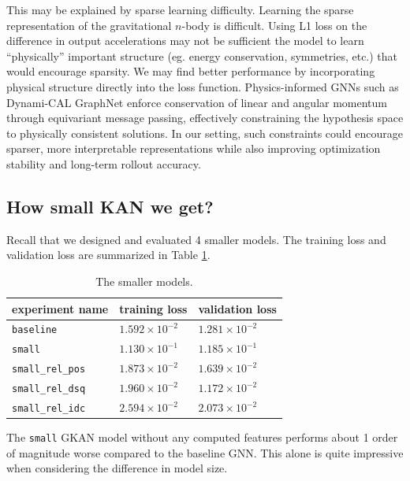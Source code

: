 \documentclass{article}
\begin{document}
This may be explained by sparse learning difficulty. Learning the sparse representation of the gravitational $n$-body is difficult. Using L1 loss on the difference in output accelerations may not be sufficient the model to learn ``physically'' important structure (eg. energy conservation, symmetries, etc.) that would encourage sparsity.  We may find better performance by incorporating physical structure directly into the loss function. Physics-informed GNNs such as Dynami-CAL GraphNet \parencite{sharma2025dynamicalgraphnetphysicsinformedgraph} enforce conservation of linear and angular momentum through equivariant message passing, effectively constraining the hypothesis space to physically consistent solutions. In our setting, such constraints could encourage sparser, more interpretable representations while also improving optimization stability and long-term rollout accuracy.

\subsection{How small KAN we get?}

Recall that we designed and evaluated 4 smaller models. The training loss and validation loss are summarized in Table \ref{tab:results-small}.

\begin{table}[h]

\centering
\caption{The smaller models.}
\begin{tabular}{l|l|l}
\hline
experiment name & training loss & validation loss \\
\hline
\texttt{baseline} & $1.592 \times 10^{-2}$ & $1.281 \times 10^{-2}$ \\
\texttt{small} & $1.130 \times 10^{-1}$ & $1.185 \times 10^{-1}$ \\
\texttt{small\_rel\_pos} & $1.873 \times 10^{-2}$ & $1.639 \times 10^{-2}$ \\
\texttt{small\_rel\_dsq} & $1.960 \times 10^{-2}$ & $1.172 \times 10^{-2}$ \\
\texttt{small\_rel\_idc} & $2.594 \times 10^{-2}$ & $2.073 \times 10^{-2}$ \\
\hline
\end{tabular}
\label{tab:results-small}

\end{table}

The \texttt{small} GKAN model without any computed features performs about 1 order of magnitude worse compared to the baseline GNN. This alone is quite impressive when considering the difference in model size.
\end{document}
